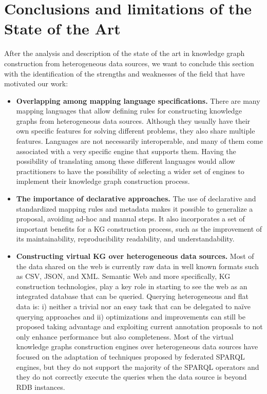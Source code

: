 \section{Conclusions and limitations of the State of the Art}
\label{sec:soa_conclusions}
After the analysis and description of the state of the art in knowledge graph construction from heterogeneous data sources, we want to conclude this section with the identification of the strengths and weaknesses of the field that have motivated our work:
\begin{itemize}
    \item \textbf{Overlapping among mapping language specifications.} There are many mapping languages that allow defining rules for constructing knowledge graphs from heterogeneous data sources. Although they usually have their own specific features for solving different problems, they also share multiple features. Languages are not necessarily interoperable, and many of them come associated with a very specific engine that supports them. Having the possibility of translating among these different languages would allow practitioners to have the possibility of selecting a wider set of engines to implement their knowledge graph construction process.
    \item \textbf{The importance of declarative approaches.} The use of declarative and standardized mapping rules and metadata makes it possible to generalize a proposal, avoiding ad-hoc and manual steps. It also incorporates a set of important benefits for a KG construction process, such as the improvement of its maintainability, reproducibility readability, and understandability.
    \item \textbf{Constructing virtual KG over heterogeneous data sources.} Most of the data shared on the web is currently raw data in well known formats such as CSV, JSON, and XML. Semantic Web and more specifically, KG construction technologies, play a key role in starting to see the web as an integrated  database that can be queried. Querying heterogeneous and flat data is: i) neither a trivial nor an easy task that can be delegated to na\"ive querying approaches and ii) optimizations and improvements can still be proposed taking advantage and exploiting current annotation proposals to not only enhance performance but also completeness. Most of the virtual knowledge graphs construction engines over heterogeneous data sources have focused on the adaptation of techniques proposed by federated SPARQL engines, but they do not support the majority of the SPARQL operators and they do not correctly execute the queries when the data source is beyond RDB instances.

\end{itemize}
